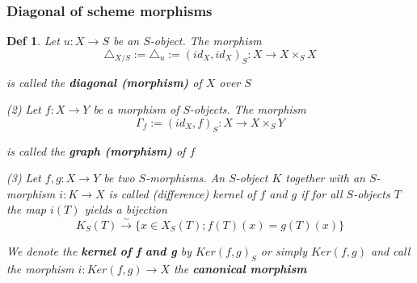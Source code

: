 \documentclass{article}
\newtheorem{definition}[theorem]{Def}
\begin{document}
\subsubsection{Diagonal of scheme morphisms}

\begin{definition}
    Let $u: X \to S$ be an $S$-object. The morphism
$$
\triangle_{X/S} := \triangle_u := (id_X, id_X)_S : X \to X \times_S X
$$

is called the \textbf{diagonal (morphism)} of $X$ over $S$

(2) Let $f : X \to Y$ be a morphism of $S$-objects. The morphism
$$
\Gamma_f := (id_X, f)_S : X \to X \times_S Y
$$

is called the \textbf{graph (morphism)} of $f$

(3) Let $f,g : X \to Y$ be two $S$-morphisms. An $S$-object $K$ together with an $S$-morphism
$i: K \to X$ is called (difference) kernel of $f$ and $g$ if for all $S$-objects $T$ the map $i(T)$
yields a bijection
$$
K_S(T) \xrightarrow{\sim} \{ x \in X_S(T) ; f(T)(x) = g(T)(x) \}
$$

We denote the \textbf{kernel of f and g} by $Ker(f,g)_S$ or simply $Ker(f,g)$ and call the
morphism $i: Ker(f,g) \to X$ the \textbf{canonical morphism}
\end{definition}
\end{document}
